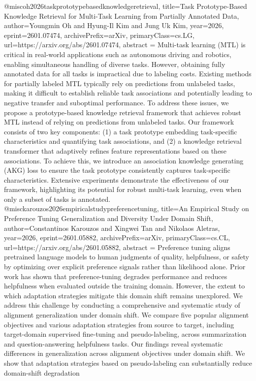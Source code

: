 {}@misc{oh2026taskprototypebasedknowledgeretrieval,
      title={Task Prototype-Based Knowledge Retrieval for Multi-Task Learning from Partially Annotated Data}, 
      author={Youngmin Oh and Hyung-Il Kim and Jung Uk Kim},
      year={2026},
      eprint={2601.07474},
      archivePrefix={arXiv},
      primaryClass={cs.LG},
      url={https://arxiv.org/abs/2601.07474},
      abstract = {Multi-task learning (MTL) is critical in real-world applications such as autonomous driving and robotics, enabling simultaneous handling of diverse tasks. However, obtaining fully annotated data for all tasks is impractical due to labeling costs. Existing methods for partially labeled MTL typically rely on predictions from unlabeled tasks, making it difficult to establish reliable task associations and potentially leading to negative transfer and suboptimal performance. To address these issues, we propose a prototype-based knowledge retrieval framework that achieves robust MTL instead of relying on predictions from unlabeled tasks. Our framework consists of two key components: (1) a task prototype embedding task-specific characteristics and quantifying task associations, and (2) a knowledge retrieval transformer that adaptively refines feature representations based on these associations. To achieve this, we introduce an association knowledge generating (AKG) loss to ensure the task prototype consistently captures task-specific characteristics. Extensive experiments demonstrate the effectiveness of our framework, highlighting its potential for robust multi-task learning, even when only a subset of tasks is annotated.}
}@misc{karouzos2026empiricalstudypreferencetuning,
      title={An Empirical Study on Preference Tuning Generalization and Diversity Under Domain Shift}, 
      author={Constantinos Karouzos and Xingwei Tan and Nikolaos Aletras},
      year={2026},
      eprint={2601.05882},
      archivePrefix={arXiv},
      primaryClass={cs.CL},
      url={https://arxiv.org/abs/2601.05882},
      abstract = {Preference tuning aligns pretrained language models to human judgments of quality, helpfulness, or safety by optimizing over explicit preference signals rather than likelihood alone. Prior work has shown that preference-tuning degrades performance and reduces helpfulness when evaluated outside the training domain. However, the extent to which adaptation strategies mitigate this domain shift remains unexplored. We address this challenge by conducting a comprehensive and systematic study of alignment generalization under domain shift. We compare five popular alignment objectives and various adaptation strategies from source to target, including target-domain supervised fine-tuning and pseudo-labeling, across summarization and question-answering helpfulness tasks. Our findings reveal systematic differences in generalization across alignment objectives under domain shift. We show that adaptation strategies based on pseudo-labeling can substantially reduce domain-shift degradation}
}
